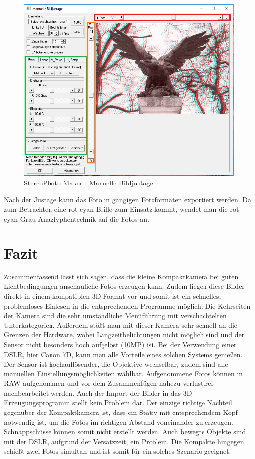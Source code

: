 \documentclass[liststotoc,bibtotoc,fontsize=14pt,]{scrreprt}
\begin{document}
		\begin{figure}[H]
			\includegraphics[width=\linewidth]{img/steps/step4.png}
			\caption{StereoPhoto Maker - Manuelle Bildjustage}
			\label{img:maker_manual}
		\end{figure}
	
		Nach der Justage kann das Foto in gängigen Fotoformaten exportiert werden. Da zum Betrachten eine rot-cyan Brille zum Einsatz kommt, wendet man die rot-cyan Grau-Anaglyphentechnik auf die Fotos an.

	\chapter{Fazit}
		Zusammenfassend lässt sich sagen, dass die kleine Kompaktkamera bei guten Lichtbedingungen anschauliche Fotos erzeugen kann. Zudem liegen diese Bilder direkt in einem kompatiblen 3D-Format vor und somit ist ein schnelles, problemloses Einlesen in die entsprechenden Programme möglich. Die Kehrseiten der Kamera sind die sehr umständliche Menüführung mit verschachtelten Unterkategorien. Außerdem stößt man mit dieser Kamera sehr schnell an die Grenzen der Hardware, wobei Langzeitbelichtungen nicht möglich sind und der Sensor nicht besonders hoch aufgelöst (10MP) ist.
		Bei der Verwendung einer DSLR, hier Canon 7D, kann man alle Vorteile eines solchen Systems genießen. Der Sensor ist hochauflösender, die Objektive wechselbar, zudem sind alle manuellen Einstellungsmöglichkeiten wählbar. Aufgenommene Fotos können in RAW aufgenommen und vor dem Zusammenfügen nahezu verlustfrei nachbearbeitet werden. Auch der Import der Bilder in das 3D-Erzeugungsprogramm stellt kein Problem dar. Der einzige richtige Nachteil gegenüber der Kompaktkamera ist, dass ein Stativ mit entsprechendem Kopf notwendig ist, um die Fotos im richtigen Abstand voneinander zu erzeugen. Schnappschüsse können somit nicht erstellt werden. Auch bewegte Objekte sind mit der DSLR, aufgrund der Versatzzeit, ein Problem. Die Kompakte hingegen schießt zwei Fotos simultan und ist somit für ein solches Szenario geeignet.
		
	
\end{document}
